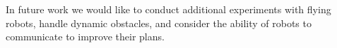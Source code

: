 \documentclass{svproc}
\newcommand{\todo}[1]{\textbf{\textcolor{red}{TODO: #1}}}
\begin{document}
In future work we would like to conduct additional experiments with flying robots, handle dynamic obstacles, and consider the ability of robots to communicate to improve their plans.


%
%





 
 
 

% 
\end{document}
